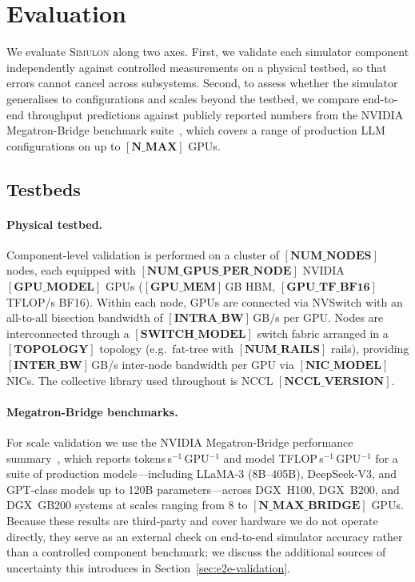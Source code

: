 \section{Evaluation}

We evaluate \textsc{Simulon} along two axes. First, we validate each
simulator component independently against controlled measurements on a
physical testbed, so that errors cannot cancel across subsystems.
Second, to assess whether the simulator generalises to configurations
and scales beyond the testbed, we compare end-to-end throughput
predictions against publicly reported numbers from the NVIDIA
Megatron-Bridge benchmark suite~\cite{megatron-bridge-perf}, which
covers a range of production LLM configurations on up to
$[\textbf{N\_MAX}]$ GPUs.

\subsection{Testbeds}

\paragraph{Physical testbed.}
Component-level validation is performed on a cluster of
$[\textbf{NUM\_NODES}]$ nodes, each equipped with
$[\textbf{NUM\_GPUS\_PER\_NODE}]$ NVIDIA $[\textbf{GPU\_MODEL}]$
GPUs ($[\textbf{GPU\_MEM}]$\,GB HBM, $[\textbf{GPU\_TF\_BF16}]$
TFLOP/s BF16). Within each node, GPUs are connected via NVSwitch with
an all-to-all bisection bandwidth of
$[\textbf{INTRA\_BW}]$\,GB/s per GPU. Nodes are
interconnected through a $[\textbf{SWITCH\_MODEL}]$ switch fabric
arranged in a $[\textbf{TOPOLOGY}]$ topology
(e.g.\ fat-tree with $[\textbf{NUM\_RAILS}]$ rails), providing
$[\textbf{INTER\_BW}]$\,GB/s inter-node bandwidth per GPU via
$[\textbf{NIC\_MODEL}]$ NICs. The collective library used throughout
is NCCL $[\textbf{NCCL\_VERSION}]$.

\paragraph{Megatron-Bridge benchmarks.}
For scale validation we use the NVIDIA Megatron-Bridge performance
summary~\cite{megatron-bridge-perf}, which reports
tokens\,s$^{-1}$\,GPU$^{-1}$ and model TFLOP\,s$^{-1}$\,GPU$^{-1}$
for a suite of production models---including LLaMA-3 (8B--405B),
DeepSeek-V3, and GPT-class models up to 120B parameters---across
DGX~H100, DGX~B200, and DGX~GB200 systems at scales ranging from 8
to $[\textbf{N\_MAX\_BRIDGE}]$ GPUs. Because these results are
third-party and cover hardware we do not operate directly, they
serve as an external check on end-to-end simulator accuracy rather
than a controlled component benchmark; we discuss the additional
sources of uncertainty this introduces in
Section~\ref{sec:e2e-validation}.

